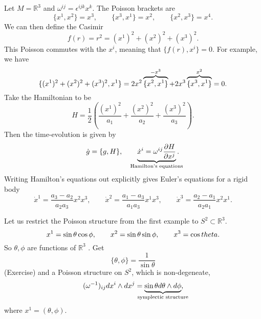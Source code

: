 \begin{example}[]
  Let $M = \mathbb{R}^3$ and $\omega^{ij} = \epsilon^{ijk} x^{k}$.
  The Poisson brackets are
  \begin{equation}
    \{ x^1, x^2 \}= x^3, \qquad
    \{ x^3, x^1 \}= x^2, \qquad
    \{ x^2, x^3 \}= x^4.
  \end{equation}
  We can then define the Casimir
  \begin{equation}
    f(r) = r^2 = (x^1)^2 + (x^2)^2 + (x^3)^2.
  \end{equation}
  This Poisson commutes with the $x^i$, meaning that $\{ f(r), x^{i} \} =0$. For example, we have
  \begin{equation}
    \{ (x^1)^2 + (x^2)^2 + (x^3)^2, x^1 \} = 2 x^2 \overbrace{\{ x^2, x^1 \}}^{\mathclap{-x^3}} + 2 x^3 \overbrace{\{ x^3, x^1 \}}^{\mathclap{x^2}} = 0.
  \end{equation}
  Take the Hamiltonian to be 
  \begin{equation}
    H = \frac{1}{2} \left( \frac{(x^1)^2}{a_1} + \frac{(x^2)^2}{a_2} + \frac{(x^3)^2}{a_3}\right).
  \end{equation} 
  Then the time-evolution is given by
  \begin{equation}
    \dot{g} = \{ g, H \}, \qquad \underbrace{\dot{x}^{i} = \omega^{ij} \frac{\partial H}{\partial x^{j}}}_{\mathclap{\text{Hamilton's equations}}}.
  \end{equation}
  Writing Hamilton's equations out explicitly gives Euler's equations for a rigid body
  \begin{equation}
    \dot{x}^1 = \frac{a_3 - a_2}{a_2 a_3} x^2 x^3, \qquad
    \dot{x}^2 = \frac{a_1 - a_3}{a_1 a_3} x^1 x^3, \qquad
    \dot{x}^3 = \frac{a_2 - a_1}{a_2 a_1} x^2 x^1.
  \end{equation}
\end{example}

\begin{example}[]
  Let us restrict the Poisson structure from the first example to $S^2 \subset \mathbb{R}^3$.
  \begin{equation}
    x^1 = \sin \theta \cos \phi, \qquad
    x^2 = \sin \theta \sin \phi, \qquad
    x^3 = \cos \\theta.
  \end{equation}
  So $\theta, \phi$ are functions of $\mathbb{R}^3$ .
  Get 
  \begin{equation}
    \{ \theta, \phi \} = \frac{1}{\sin \theta}
  \end{equation}
  (Exercise) and a Poisson structure on $S^2$, which is non-degeneate, 
  \begin{equation}
    (\omega^{-1})_{ij} dx^{i} \wedge dx^{j} = \underbrace{\sin \theta d\theta \wedge d\phi}_{\mathclap{\text{symplectic structure}}},
  \end{equation}
  where $x^1 = (\theta, \phi)$.
\end{example}
